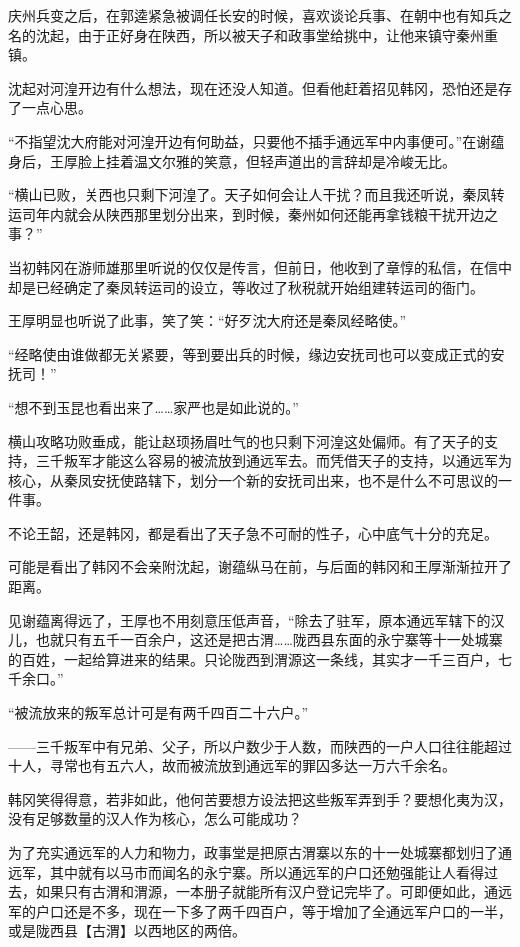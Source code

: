 庆州兵变之后，在郭逵紧急被调任长安的时候，喜欢谈论兵事、在朝中也有知兵之名的沈起，由于正好身在陕西，所以被天子和政事堂给挑中，让他来镇守秦州重镇。

沈起对河湟开边有什么想法，现在还没人知道。但看他赶着招见韩冈，恐怕还是存了一点心思。

“不指望沈大府能对河湟开边有何助益，只要他不插手通远军中内事便可。”在谢蕴身后，王厚脸上挂着温文尔雅的笑意，但轻声道出的言辞却是冷峻无比。

“横山已败，关西也只剩下河湟了。天子如何会让人干扰？而且我还听说，秦凤转运司年内就会从陕西那里划分出来，到时候，秦州如何还能再拿钱粮干扰开边之事？”

当初韩冈在游师雄那里听说的仅仅是传言，但前日，他收到了章惇的私信，在信中却是已经确定了秦凤转运司的设立，等收过了秋税就开始组建转运司的衙门。

王厚明显也听说了此事，笑了笑：“好歹沈大府还是秦凤经略使。”

“经略使由谁做都无关紧要，等到要出兵的时候，缘边安抚司也可以变成正式的安抚司！”

“想不到玉昆也看出来了……家严也是如此说的。”

横山攻略功败垂成，能让赵顼扬眉吐气的也只剩下河湟这处偏师。有了天子的支持，三千叛军才能这么容易的被流放到通远军去。而凭借天子的支持，以通远军为核心，从秦凤安抚使路辖下，划分一个新的安抚司出来，也不是什么不可思议的一件事。

不论王韶，还是韩冈，都是看出了天子急不可耐的性子，心中底气十分的充足。

可能是看出了韩冈不会亲附沈起，谢蕴纵马在前，与后面的韩冈和王厚渐渐拉开了距离。

见谢蕴离得远了，王厚也不用刻意压低声音，“除去了驻军，原本通远军辖下的汉儿，也就只有五千一百余户，这还是把古渭……陇西县东面的永宁寨等十一处城寨的百姓，一起给算进来的结果。只论陇西到渭源这一条线，其实才一千三百户，七千余口。”

“被流放来的叛军总计可是有两千四百二十六户。”

——三千叛军中有兄弟、父子，所以户数少于人数，而陕西的一户人口往往能超过十人，寻常也有五六人，故而被流放到通远军的罪囚多达一万六千余名。

韩冈笑得得意，若非如此，他何苦要想方设法把这些叛军弄到手？要想化夷为汉，没有足够数量的汉人作为核心，怎么可能成功？

为了充实通远军的人力和物力，政事堂是把原古渭寨以东的十一处城寨都划归了通远军，其中就有以马市而闻名的永宁寨。所以通远军的户口还勉强能让人看得过去，如果只有古渭和渭源，一本册子就能所有汉户登记完毕了。可即便如此，通远军的户口还是不多，现在一下多了两千四百户，等于增加了全通远军户口的一半，或是陇西县【古渭】以西地区的两倍。

